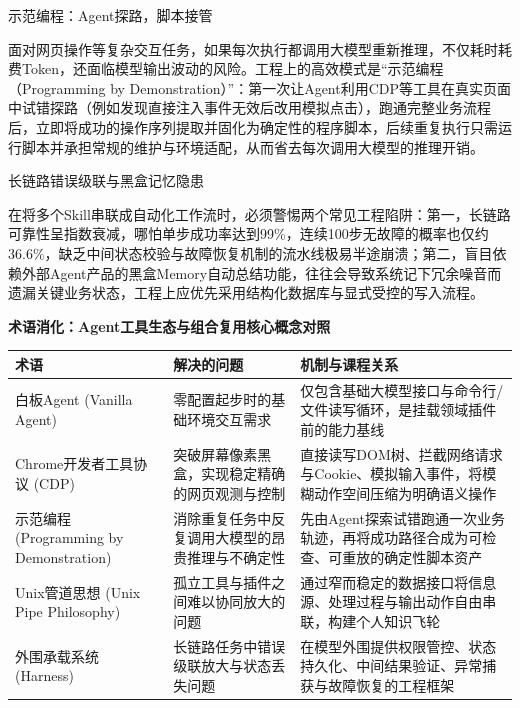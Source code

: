 \documentclass[UTF8,a4paper,11pt,fontset=fandol]{ctexart}
\begin{document}
\begin{knowledgebox}{示范编程：Agent探路，脚本接管}

面对网页操作等复杂交互任务，如果每次执行都调用大模型重新推理，不仅耗时耗费Token，还面临模型输出波动的风险。工程上的高效模式是“示范编程（Programming by Demonstration）”：第一次让Agent利用CDP等工具在真实页面中试错探路（例如发现直接注入事件无效后改用模拟点击），跑通完整业务流程后，立即将成功的操作序列提取并固化为确定性的程序脚本，后续重复执行只需运行脚本并承担常规的维护与环境适配，从而省去每次调用大模型的推理开销。

\end{knowledgebox}

\begin{warningbox}{长链路错误级联与黑盒记忆隐患}

在将多个Skill串联成自动化工作流时，必须警惕两个常见工程陷阱：第一，长链路可靠性呈指数衰减，哪怕单步成功率达到99\%，连续100步无故障的概率也仅约36.6\%，缺乏中间状态校验与故障恢复机制的流水线极易半途崩溃；第二，盲目依赖外部Agent产品的黑盒Memory自动总结功能，往往会导致系统记下冗余噪音而遗漏关键业务状态，工程上应优先采用结构化数据库与显式受控的写入流程。

\end{warningbox}

\par{}\textbf{术语消化：Agent工具生态与组合复用核心概念对照}

\begin{center}\small\begin{tabularx}{\linewidth}{YYY}

\toprule

术语 & 解决的问题 & 机制与课程关系\\\midrule

白板Agent (Vanilla Agent) & 零配置起步时的基础环境交互需求 & 仅包含基础大模型接口与命令行/文件读写循环，是挂载领域插件前的能力基线\\[3pt]

Chrome开发者工具协议 (CDP) & 突破屏幕像素黑盒，实现稳定精确的网页观测与控制 & 直接读写DOM树、拦截网络请求与Cookie、模拟输入事件，将模糊动作空间压缩为明确语义操作\\[3pt]

示范编程 (Programming by Demonstration) & 消除重复任务中反复调用大模型的昂贵推理与不确定性 & 先由Agent探索试错跑通一次业务轨迹，再将成功路径合成为可检查、可重放的确定性脚本资产\\[3pt]

Unix管道思想 (Unix Pipe Philosophy) & 孤立工具与插件之间难以协同放大的问题 & 通过窄而稳定的数据接口将信息源、处理过程与输出动作自由串联，构建个人知识飞轮\\[3pt]

外围承载系统 (Harness) & 长链路任务中错误级联放大与状态丢失问题 & 在模型外围提供权限管控、状态持久化、中间结果验证、异常捕获与故障恢复的工程框架\\[3pt]

\bottomrule\end{tabularx}\end{center}
\end{document}
